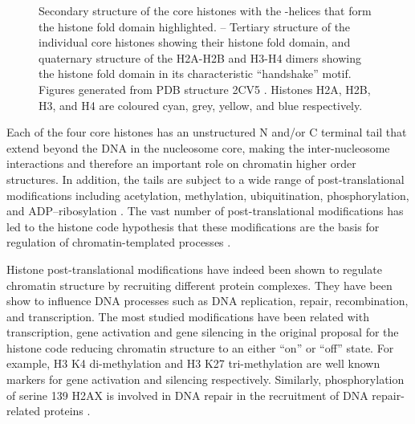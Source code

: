 \begin{figure}
                     {
                       Secondary structure of the core histones with
                       the \textalpha-helices that form the histone
                       fold domain highlighted.
                       --%
                       Tertiary structure of the individual core
                       histones showing their histone fold domain, and
                       quaternary structure of the H2A-H2B and H3-H4
                       dimers showing the histone fold domain in its
                       characteristic ``handshake'' motif.  Figures
                       generated from PDB structure 2CV5
                       \citep{tsunaka2005-2cv5}.  Histones H2A, H2B,
                       H3, and H4 are coloured cyan, grey, yellow, and
                       blue respectively.}
      \end{figure}


      Each of the four core histones has an unstructured N and/or C
      terminal tail that extend beyond the DNA in the nucleosome core,
      making the inter-nucleosome interactions and therefore an important
      role on chromatin higher order structures.
      In addition, the tails are subject to a wide range of
      post-translational modifications
      including acetylation, methylation, ubiquitination, phosphorylation,
      and ADP--ribosylation \citep{bannister2011ptm-review}.
      The vast number of post-translational modifications has led to the
      histone code hypothesis that these modifications are the basis for
      regulation of chromatin-templated processes \citep{jenuwein200histone-code}.


      Histone post-translational modifications have indeed been shown to
      regulate chromatin structure
      by recruiting different protein complexes.
      They have been show to influence
      DNA processes such as DNA replication, repair, recombination,
      and transcription.
      The most studied modifications have been related with transcription,
      gene activation and gene silencing in
      the original proposal for the histone code \citep{jenuwein200histone-code}
      reducing chromatin structure to an either ``on'' or ``off'' state.
      For example,
      H3 K4 di-methylation and H3 K27 tri-methylation are well known
      markers for gene activation and silencing respectively.
      Similarly,
      phosphorylation of serine 139 H2AX is involved in DNA repair
      in the recruitment of DNA repair-related proteins .

